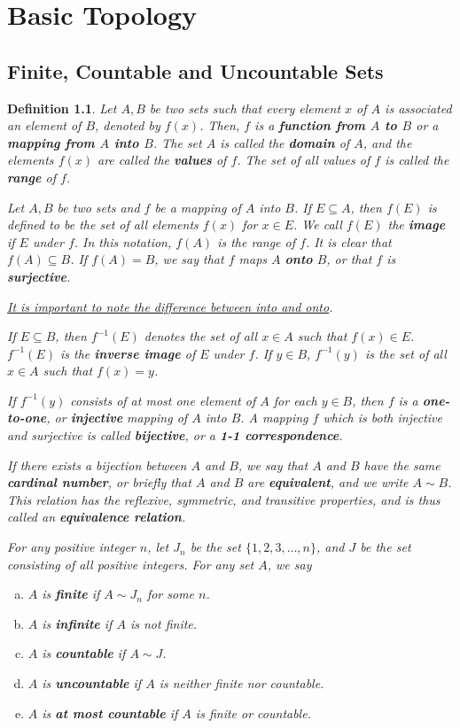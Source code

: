 \documentclass{scrbook}
\renewcommand{\underline}{\ul}
\newtheorem{definition}{Definition}
\begin{document}
\chapter{Basic Topology}

\section{Finite, Countable and Uncountable Sets}

\begin{definition}
Let $A, B$ be two sets such that every element $x$ of $A$ is associated an element of $B$, denoted by $f(x)$. Then, $f$ is a \textbf{function from $A$ to $B$} or a \textbf{mapping from $A$ into $B$}. The set $A$ is called the \textbf{domain} of $A$, and the elements $f(x)$ are called the \textbf{values} of $f$. The set of all values of $f$ is called the \textbf{range} of $f$.

Let $A, B$ be two sets and $f$ be a mapping of $A$ into $B$. If $E \subseteq A$, then $f(E)$ is defined to be the set of all elements $f(x)$ for $x \in E$. We call $f(E)$ the \textbf{image} if $E$ under $f$. In this notation, $f(A)$ is the range of $f$. It is clear that $f(A) \subseteq B$. If $f(A) = B$, we say that $f$ maps $A$ \textbf{onto} $B$, or that $f$ is \textbf{surjective}. 

\underline{It is important to note the difference between into and onto}.

If $E \subseteq B$, then $f^{-1}(E)$ denotes the set of all $x \in A$ such that $f(x) \in E$. $f^{-1}(E)$ is the \textbf{inverse image} of $E$ under $f$. If $y \in B$, $f^{-1}(y)$ is the set of all $x \in A$ such that $f(x) = y$.

If $f^{-1}(y)$ consists of at most one element of $A$ for each $y \in B$, then $f$ is a \textbf{one-to-one}, or \textbf{injective} mapping of $A$ into $B$. A mapping $f$ which is both injective and surjective is called \textbf{bijective}, or a  \textbf{1-1 correspondence}. 

If there exists a bijection between $A$ and $B$, we say that $A$ and $B$ have the same \textbf{cardinal number}, or briefly that $A$ and $B$ are \textbf{equivalent}, and we write $A \sim B$. This relation has the reflexive, symmetric, and transitive properties, and is thus called an \textbf{equivalence relation}.

For any positive integer $n$, let $J_n$ be the set $\{1, 2, 3, \dotsc, n\}$, and $J$ be the set consisting of all positive integers. For any set $A$, we say
\begin{enumerate}[(a)]
\item $A$ is \textbf{finite} if $A \sim J_n$ for some $n$.
\item $A$ is \textbf{infinite} if $A$ is not finite.
\item $A$ is \textbf{countable} if $A \sim J$.
\item $A$ is \textbf{uncountable} if $A$ is neither finite nor countable.
\item $A$ is \textbf{at most countable} if $A$ is finite or countable.
\end{enumerate}


\end{definition}
\end{document}
